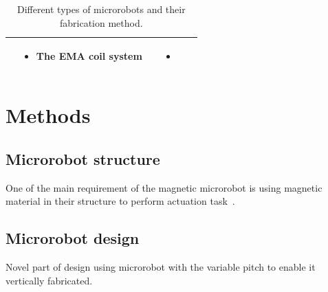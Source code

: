 \documentclass[12pt,a4paper,titlepage]{report}
\begin{document}
\begin{table}[h!]
\begin{tabular}{ c m{2.5cm}  m{4.3cm} m{3cm} m{2cm}}
\begin{minipage}[t]{3cm}
\begin{itemize}
      \end{itemize}
    \end{minipage}
    & 
    \begin{minipage}[t]{4cm}
      \begin{itemize}
        \item The EMA coil system
     
      \end{itemize}
    \end{minipage}
&



	&
	   \begin{itemize}
        \item \citep{ko2012jellyfish}
   
      \end{itemize}
    \\ \hline








  \end{tabular}
  
  \caption{Different types of microrobots and their fabrication method.}\label{Micro}
\end{table}



\chapter{Methods}

\section{Microrobot structure}

One of the main requirement of the magnetic microrobot is using magnetic material in their structure 
to perform actuation task~\citep{qiu2014noncytotoxic}. 







\section{Microrobot design} \label{microDesign}

Novel part of design using microrobot with the variable pitch to enable it vertically fabricated.
\end{document}
